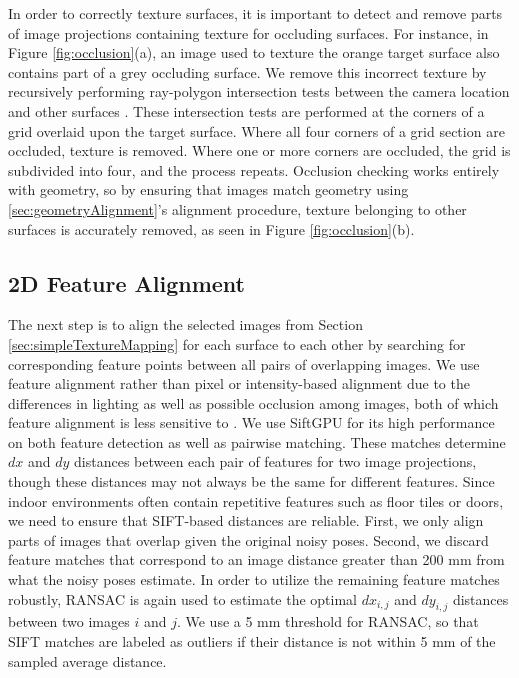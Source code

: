 \documentclass[]{spie}  %
\begin{document}
In order to correctly texture surfaces, it is important to detect and
remove parts of image projections containing texture for occluding
surfaces. For instance, in Figure \ref{fig:occlusion}(a), an image
used to texture the orange target surface also contains part of a grey
occluding surface. We remove this incorrect texture by recursively
performing ray-polygon intersection tests between the camera location
and other surfaces \cite{rayintersection}. These intersection tests
are performed at the corners of a grid overlaid upon the target
surface. Where all four corners of a grid section are occluded,
texture is removed. Where one or more corners are occluded, the grid
is subdivided into four, and the process repeats. Occlusion checking
works entirely with geometry, so by ensuring that images match
geometry using \ref{sec:geometryAlignment}'s alignment procedure,
texture belonging to other surfaces is accurately removed, as seen in
Figure \ref{fig:occlusion}(b).

\subsection{2D Feature Alignment}
\label{sec:robustSIFTFeatureMatching}
The next step is to align the selected images from Section
\ref{sec:simpleTextureMapping} for each surface to each other by
searching for corresponding feature points between all pairs of
overlapping images. We use feature alignment rather than pixel or
intensity-based alignment due to the differences in lighting as well
as possible occlusion among images, both of which feature alignment is
less sensitive to \cite{lowe1999object, mikolajczyk2005performance,
  szeliski2006image}. We use SiftGPU \cite{siftgpu} for its high
performance on both feature detection as well as pairwise
matching. These matches determine $dx$ and $dy$ distances between each
pair of features for two image projections, though these distances may
not always be the same for different features. Since indoor
environments often contain repetitive features such as floor tiles or
doors, we need to ensure that SIFT-based distances are
reliable. First, we only align parts of images that overlap given the
original noisy poses. Second, we discard feature matches that
correspond to an image distance greater than 200 mm from what the
noisy poses estimate. In order to utilize the remaining feature
matches robustly, RANSAC \cite{fischler1981random} is again used to
estimate the optimal $dx_{i,j}$ and $dy_{i,j}$ distances between two
images $i$ and $j$. We use a 5 mm threshold for RANSAC, so that SIFT
matches are labeled as outliers if their distance is not within 5 mm
of the sampled average distance.
\end{document}
